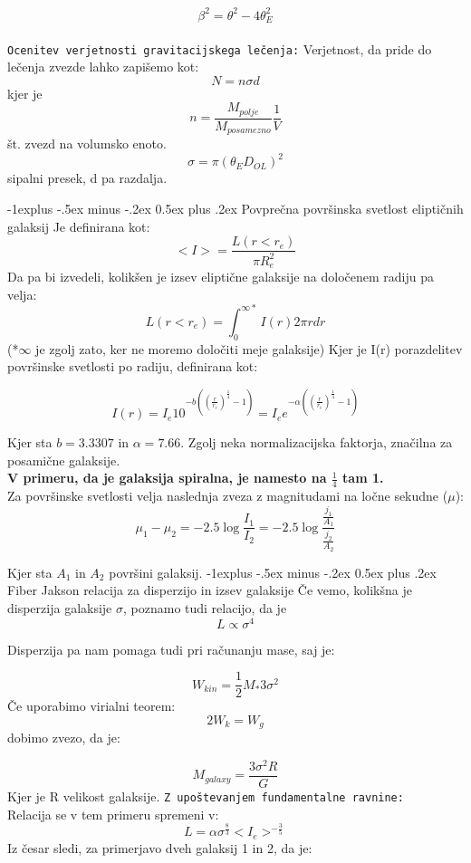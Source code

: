\documentclass[12pt,landscape]{article}
\makeatletter
\renewcommand{\subsection}{\@startsection{subsection}{2}{0mm}%
                                {-1explus -.5ex minus -.2ex}%
                                {0.5ex plus .2ex}%
                                {\normalfont\normalsize\bfseries}}
\makeatother
\begin{document}
\begin{multicols}{3}
$$\beta^2 =\theta^2-4\theta_E^2$$
\\
\texttt{Ocenitev verjetnosti gravitacijskega lečenja:}
Verjetnost, da pride do lečenja zvezde lahko zapišemo kot:
$$N=n \sigma d$$ 
kjer je 
$$n=\frac{M_{polje}}{M_{posamezno}} \frac{1}{V}$$ št. zvezd na volumsko enoto. $$\sigma=\pi (\theta_E D_{OL})^2$$ sipalni presek, d pa razdalja.

\subsection{Povprečna površinska svetlost eliptičnih galaksij}
Je definirana kot:
$$<I>=\frac{L(r<r_e)}{\pi R_e^2}$$
Da pa bi izvedeli, kolikšen je izsev eliptične galaksije na določenem radiju pa velja:
$$L(r<r_e)=\int_{0}^{\infty*} I(r)2\pi r dr$$
(*$\infty$ je zgolj zato, ker ne moremo določiti meje galaksije)
Kjer je I(r) porazdelitev površinske svetlosti po radiju, definirana kot:

$$I(r)=I_e 10^{-b\left(\left(\frac{r}{r_e}\right)^{\frac{1}{4}}-1\right)}=I_e e^{-\alpha\left(\left(\frac{r}{r_e}\right)^{\frac{1}{4}}-1\right)}$$

Kjer sta $b=3.3307$ in $\alpha=7.66$. Zgolj neka normalizacijska faktorja, značilna za posamične galaksije.\\
\textbf{V primeru, da je galaksija spiralna, je namesto na $\frac{1}{4}$ tam 1.}\\

Za površinske svetlosti velja naslednja zveza z magnitudami na ločne sekudne ($\mu$):
$$\mu_1 -\mu_2=-2.5 \log\frac{I_1}{I_2}=-2.5 \log \frac{\frac{j_1}{A_1}}{\frac{j_2}{A_2}}$$

Kjer sta $A_1$ in $A_2$ površini galaksij.
\subsection{Fiber Jakson relacija za disperzijo in izsev galaksije}
Če vemo, kolikšna je disperzija galaksije $\sigma$, poznamo tudi relacijo, da je
$$L \propto \sigma^4$$

Disperzija pa nam pomaga tudi pri računanju mase, saj je:

$$W_{kin}=\frac{1}{2}M_* 3\sigma^2$$
Če uporabimo virialni teorem:
$$2W_k=W_g$$ dobimo zvezo, da je:

$$M_{galaxy}=\frac{3\sigma^2 R}{G}$$
Kjer je R velikost galaksije.
\texttt{Z upoštevanjem fundamentalne ravnine:}\\
Relacija se v tem primeru spremeni v:
$$L=\alpha \sigma^{\frac{8}{3}}<I_e>^{-\frac{3}{5}}$$
Iz česar sledi, za primerjavo dveh galaksij 1 in 2, da je:


\end{multicols}
\end{document}
